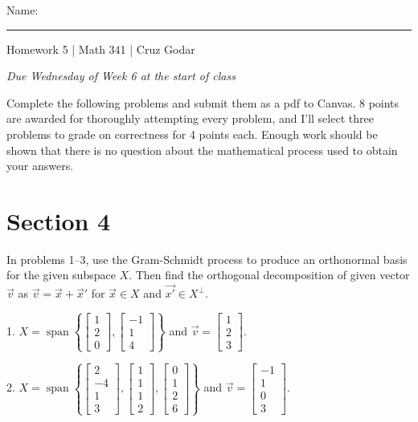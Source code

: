 \documentclass{article}
\begin{document}
\Large Name: \rule{2in}{0.15mm} \hfill Homework 5 | Math 341 | Cruz Godar \vspace{4pt} \normalsize

\textit{Due Wednesday of Week 6 at the start of class}

Complete the following problems and submit them as a pdf to Canvas. 8 points are awarded for thoroughly attempting every problem, and I'll select three problems to grade on correctness for 4 points each. Enough work should be shown that there is no question about the mathematical process used to obtain your answers.

\section{Section 4}

In problems 1--3, use the Gram-Schmidt process to produce an orthonormal basis for the given subspace $X$. Then find the orthogonal decomposition of given vector $\vec{v}$ as $\vec{v} = \vec{x} + \vec{x}'$ for $\vec{x} \in X$ and $\vec{x'} \in X^\perp$.

1. $X = \operatorname{span}\left\{ \left[\begin{array}{c} 1 \\ 2 \\ 0 \end{array}\right], \left[\begin{array}{c} -1 \\ 1 \\ 4 \end{array}\right] \right\}$ and $\vec{v} = \left[\begin{array}{c} 1 \\ 2 \\ 3 \end{array}\right]$.

2. $X = \operatorname{span}\left\{ \left[\begin{array}{c} 2 \\ -4 \\ 1 \\ 3 \end{array}\right], \left[\begin{array}{c} 1 \\ 1 \\ 1 \\ 2 \end{array}\right], \left[\begin{array}{c} 0 \\ 1 \\ 2 \\ 6 \end{array}\right] \right\}$ and $\vec{v} = \left[\begin{array}{c} -1 \\ 1 \\ 0 \\ 3 \end{array}\right]$.
\end{document}
